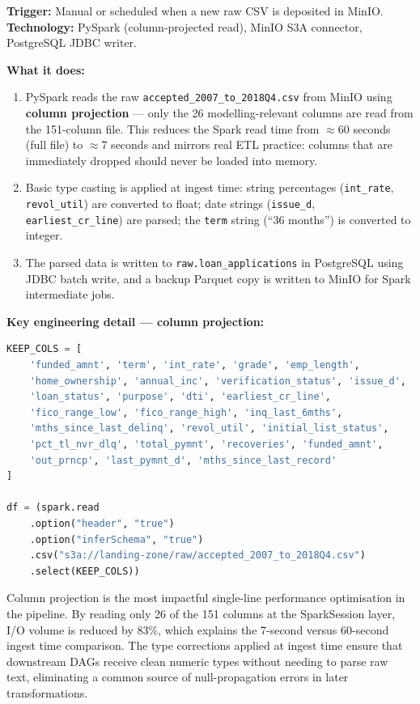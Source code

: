 \documentclass[12pt,a4paper]{report}
\begin{document}
\textbf{Trigger:} Manual or scheduled when a new raw CSV is deposited in MinIO.\\
\textbf{Technology:} PySpark (column-projected read), MinIO S3A connector, PostgreSQL JDBC writer.

\textbf{What it does:}
\begin{enumerate}
  \item PySpark reads the raw \texttt{accepted\_2007\_to\_2018Q4.csv} from MinIO using \textbf{column projection} --- only the 26 modelling-relevant columns are read from the 151-column file. This reduces the Spark read time from $\approx$60 seconds (full file) to $\approx$7 seconds and mirrors real ETL practice: columns that are immediately dropped should never be loaded into memory.
  \item Basic type casting is applied at ingest time: string percentages (\texttt{int\_rate}, \texttt{revol\_util}) are converted to float; date strings (\texttt{issue\_d}, \texttt{earliest\_cr\_line}) are parsed; the \texttt{term} string (``36 months'') is converted to integer.
  \item The parsed data is written to \texttt{raw.loan\_applications} in PostgreSQL using JDBC batch write, and a backup Parquet copy is written to MinIO for Spark intermediate jobs.
\end{enumerate}

\textbf{Key engineering detail --- column projection:}
\begin{lstlisting}[language=Python, caption={Column-projected PySpark read in DAG-01}]
KEEP_COLS = [
    'funded_amnt', 'term', 'int_rate', 'grade', 'emp_length',
    'home_ownership', 'annual_inc', 'verification_status', 'issue_d',
    'loan_status', 'purpose', 'dti', 'earliest_cr_line',
    'fico_range_low', 'fico_range_high', 'inq_last_6mths',
    'mths_since_last_delinq', 'revol_util', 'initial_list_status',
    'pct_tl_nvr_dlq', 'total_pymnt', 'recoveries', 'funded_amnt',
    'out_prncp', 'last_pymnt_d', 'mths_since_last_record'
]

df = (spark.read
    .option("header", "true")
    .option("inferSchema", "true")
    .csv("s3a://landing-zone/raw/accepted_2007_to_2018Q4.csv")
    .select(KEEP_COLS))
\end{lstlisting}

\medskip
\noindent Column projection is the most impactful single-line performance optimisation in the pipeline. By reading only 26 of the 151 columns at the SparkSession layer, I/O volume is reduced by 83\%, which explains the 7-second versus 60-second ingest time comparison. The type corrections applied at ingest time ensure that downstream DAGs receive clean numeric types without needing to parse raw text, eliminating a common source of null-propagation errors in later transformations.
\end{document}
